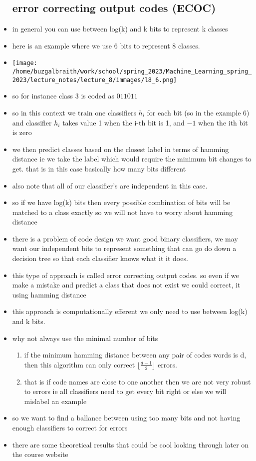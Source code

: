 \documentclass{article}
\begin{document}
\begin{itemize}
\subsection*{error correcting output codes (ECOC) }
\item in general you can use between log(k) and k bits to represent k classes
\item here is an example where we use 6 bits  to represent 8 classes. 
 \item  \texttt{[image: /home/buzgalbraith/work/school/spring\_2023/Machine\_Learning\_spring\_2023/lecture\_notes/lecture\_8/immages/l8\_6.png]}
\item so for instance class 3 is coded as $011011$
\item so in this context we train one classifiers $h_i$ for each bit (so in the example 6) and classifier $h_i$ takes value 1 when the i-th bit is 1, and $-1$ when the ith bit is zero
\item we then predict classes based on the closest label in terms of hamming distance ie we take the label which would require the minimum bit changes to get. that is in this case basically how many bits different
\item also note that all of our classifier's are independent in this case.   
\item so if we have log(k) bits then every possible combination of bits will be matched to a class exactly so we will not have to worry about hamming distance 
\item there is a problem of code design we want good binary classifiers, we may want our independent bits to represent something that can go do down a decision tree so that each classifier knows what it it does. 
\item this type of approach is called error correcting output codes. so even if we make a mistake and predict a class that does not exist we could correct, it using hamming distance 
\item this approach is computationally efferent we only need to use between log(k) and k bits. 
\item why not always use the minimal number of bits 
\begin{enumerate}
    \item if the minimum hamming distance between any pair of codes words is d, then this algorithm can only correct $\lfloor\frac{d-1}{2}\rfloor$ errors. 
    \item that is if code names are close to one another then we are not very robust to errors ie all classifiers need to get every bit right or else we will mislabel an example 
\end{enumerate}
\item so we want to find a ballance between using too many bits and not having enough classifiers to correct for errors
\item there are some theoretical results that could be cool looking through later on the course website

\end{itemize}
\end{document}
